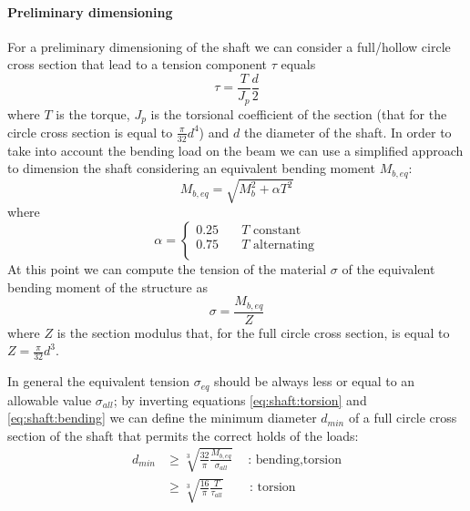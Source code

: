 \begin{multicols}
 	\paragraph{Preliminary dimensioning} For a preliminary dimensioning of the shaft we can consider a full/hollow circle cross section that lead to a tension component $\tau$ equals
 	\begin{equation} \label{eq:shaft:torsion}
 		\tau = \frac{T}{J_p} \frac d 2
 	\end{equation}
 	where $T$ is the torque, $J_p$ is the torsional coefficient of the section (that for the circle cross section is equal to $\frac{\pi}{32}d^4$) and $d$ the diameter of the shaft. In order to take into account the bending load on the beam we can use a simplified approach to dimension the shaft considering an equivalent bending moment $M_{b,eq}$:
 	\begin{equation} \label{eq:shaft:bending}
 		M_{b,eq} = \sqrt{M_b^2 + \alpha T^2}
 	\end{equation}
 	where
 	\[ \alpha = \begin{cases}
 		0.25 \quad & T \textrm{ constant} \\
 		0.75 \quad & T \textrm{ alternating} \\
 	\end{cases} \]
	At this point we can compute the tension of the material $\sigma$ of the equivalent bending moment of the structure as
	\begin{equation}
		\sigma = \frac{M_{b,eq}}{Z}
	\end{equation}
	where $Z$ is the section modulus that, for the full circle cross section, is equal to $Z = \frac{\pi}{32} d^3$.
	
	In general the equivalent tension $\sigma_{eq}$ should be always less or equal to an allowable value $\sigma_{all}$; by inverting equations \ref{eq:shaft:torsion} and \ref{eq:shaft:bending} we can define the minimum diameter $d_{min}$ of a full circle cross section of the shaft that permits the correct holds of the loads:
	\begin{equation} \label{eq:shaft:dmin}
	\begin{split}
		d_{min} & \geq \sqrt[3]{\frac{32}{\pi} \frac{M_{b,eq}}{\sigma_{all}} } \quad \,\textrm{: bending,torsion} \\
		& \geq \sqrt[3]{\frac{16}{\pi} \frac{T}{\tau_{all}} } \qquad \textrm{: torsion} 
	\end{split}
	\end{equation}


\end{multicols}
